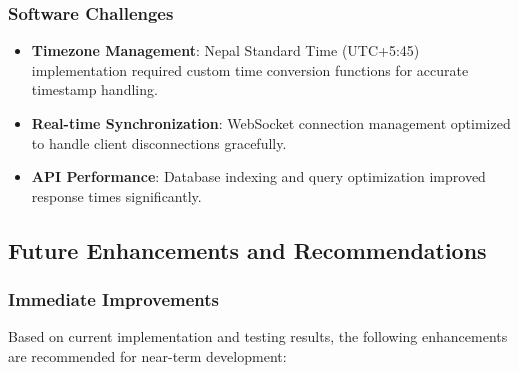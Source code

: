 \documentclass[12pt,a4paper]{article}
\begin{document}
\subsubsection{Software Challenges}

\begin{itemize}
    \item \textbf{Timezone Management}: Nepal Standard Time (UTC+5:45) implementation required custom time conversion functions for accurate timestamp handling.
    
    \item \textbf{Real-time Synchronization}: WebSocket connection management optimized to handle client disconnections gracefully.
    
    \item \textbf{API Performance}: Database indexing and query optimization improved response times significantly.
\end{itemize}

\subsection{Future Enhancements and Recommendations}

\subsubsection{Immediate Improvements}

Based on current implementation and testing results, the following enhancements are recommended for near-term development:
\end{document}
